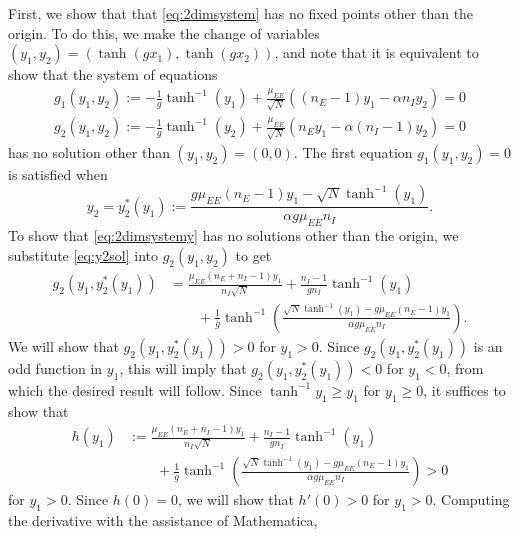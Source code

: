 \documentclass[reqno]{siamonline190516}
\begin{document}
First, we show that that \cref{eq:2dimsystem} has no fixed points other than the origin. To do this, we make the change of variables $(y_1, y_2) = (\tanh(g x_1),\tanh(g x_2))$, and note that it is equivalent to show that the system of equations
\begin{equation}\label{eq:2dimsystemy}
\begin{aligned}
g_1(y_1, y_2) := -\frac{1}{g}\tanh^{-1}(y_1) + \frac{\mu_{EE}}{\sqrt{N}}\left((n_E - 1) y_1 - \alpha n_I y_2 \right) = 0 \\
g_2(y_1, y_2) := -\frac{1}{g}\tanh^{-1}(y_2) + \frac{\mu_{EE}}{\sqrt{N}}\left( n_E y_1 - \alpha (n_I - 1) y_2 \right) = 0
\end{aligned}
\end{equation}
has no solution other than $(y_1, y_2) = (0,0)$. The first equation $g_1(y_1, y_2) = 0$ is satisfied when
\begin{equation}\label{eq:y2sol}
y_2 = y_2^*(y_1) := \frac{ g \mu_{EE} (n_E-1) y_1 - \sqrt{N} \tanh^{-1}(y_1)}{\alpha g \mu_{EE} n_I}.
\end{equation}
To show that \cref{eq:2dimsystemy} has no solutions other than the origin, we substitute \cref{eq:y2sol} into $g_2(y_1, y_2)$ to get 
\begin{equation}
\begin{aligned}
g_2(y_1, y_2^*(y_1)) &= \frac{\mu_{EE}( n_E + n_I - 1) y_1 }{n_I \sqrt{N}} + \frac{n_I - 1}{g n_I} \tanh^{-1}(y_1) \\
&\qquad+ \frac{1}{g} \tanh^{-1} \left( \frac{ \sqrt{N} \tanh^{-1}(y_1) - g \mu_{EE}(n_E -1) y_1}{ \alpha g \mu_{EE} n_I } \right).
\end{aligned}
\end{equation}    
We will show that $g_2(y_1, y_2^*(y_1)) > 0$ for $y_1 > 0$. Since $g_2(y_1, y_2^*(y_1))$ is an odd function in $y_1$, this will imply that $g_2(y_1, y_2^*(y_1)) < 0$ for $y_1 < 0$, from which the desired result will follow. Since $\tanh^{-1}y_1 \geq y_1$ for $y_1 \geq 0$, it suffices to show that
\begin{equation}\label{eq:h}
\begin{aligned}
h(y_1) &:= \frac{\mu_{EE}( n_E + n_I - 1) y_1 }{n_I \sqrt{N}} + \frac{n_I - 1}{g n_I} \tanh^{-1}(y_1) \\
&\qquad+ \frac{1}{g} \tanh^{-1} \left( \frac{ \sqrt{N} \tanh^{-1}(y_1) - g \mu_{EE}(n_E -1) y_1}{ \alpha g \mu_{EE} n_I } \right) > 0
\end{aligned}
\end{equation}
for $y_1 > 0$. Since $h(0) = 0$, we will show that $h'(0) > 0$ for $y_1 > 0$. Computing the derivative with the assistance of Mathematica,
\end{document}
